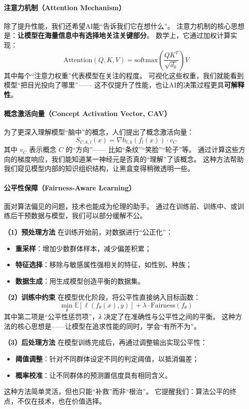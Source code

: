 \paragraph{注意力机制（Attention Mechanism）}  
除了提升性能，我们还希望AI能“告诉我们它在想什么”。  
注意力机制的核心思想是：\textbf{让模型在海量信息中有选择地关注关键部分}。  
数学上，它通过加权计算实现：  
$$\text{Attention}(Q,K,V)=\text{softmax}\left(\frac{QK^T}{\sqrt{d_k}}\right)V$$  
其中每个“注意力权重”代表模型在关注的程度。  
可视化这些权重，我们就能看到模型“把目光投向了哪里”——  
这不仅提升了性能，也让AI的决策过程更具\textbf{可解释性}。

\paragraph{概念激活向量（Concept Activation Vector, CAV）}  
为了更深入理解模型“脑中”的概念，人们提出了概念激活向量：  
$$S_{C,k,l}(x)=\nabla h_{l,k}(f_l(x)) \cdot v_C$$  
其中 $v_C$ 表示概念 $C$ 的“方向”——  
比如“条纹”“笑脸”“轮子”等。  
通过计算这些方向的梯度响应，我们能知道某一神经元是否真的“理解”了该概念。  
这种方法帮助我们窥见模型内部的知识组织结构，让黑盒变得稍微透明一些。

\paragraph{公平性保障（Fairness-Aware Learning）}  
面对算法偏见的问题，技术也能成为伦理的助手。  
通过在训练前、训练中、或训练后干预数据与模型，我们可以部分缓解不公。  

\textbf{（1）预处理方法}  
在训练开始前，对数据进行“公正化”：  
\begin{itemize}
\item \textbf{重采样}：增加少数群体样本，减少偏差积累；  
\item \textbf{特征选择}：移除与敏感属性强相关的特征，如性别、种族；  
\item \textbf{数据生成}：用生成模型创造平衡的数据集。  
\end{itemize}

\textbf{（2）训练中约束}  
在模型优化阶段，将公平性直接纳入目标函数：  
$$\min_\theta \mathbb{E}[\ell(f_\theta(x), y)] + \lambda \cdot \text{Fairness}(f_\theta)$$  
其中第二项是“公平性惩罚项”，\textit{λ} 决定了在准确性与公平性之间的平衡。  
这种方法的核心思想是——让模型在追求性能的同时，学会“有所不为”。

\textbf{（3）后处理方法}  
在模型训练完成后，再通过调整输出实现公平性：  
\begin{itemize}
\item \textbf{阈值调整}：针对不同群体设定不同的判定阈值，以抵消偏差；  
\item \textbf{概率校准}：让不同群体的预测置信度具有相同含义。  
\end{itemize}
这种方法简单灵活，但也只能“补救”而非“根治”。  
它提醒我们：算法公平的终点，不仅在技术，也在价值选择。

